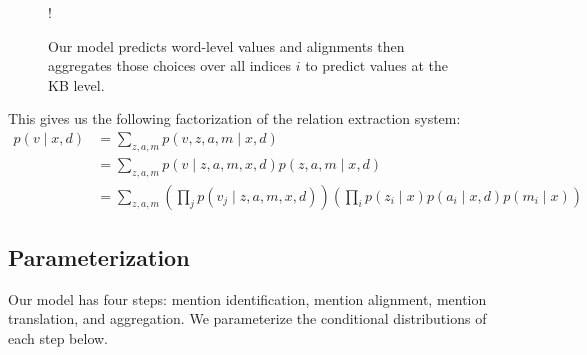 \documentclass[12pt]{article}
\begin{document}
\begin{figure}[h]
\begin{center}
\resizebox {.35\columnwidth} {!} {
} %
\end{center}
\caption{Our model predicts word-level values and alignments
then aggregates those choices over all indices $i$ to
predict values at the KB level.
}
\label{fig:infmodel}
\end{figure}

This gives us the following factorization of the relation extraction system:
\begin{equation}
\label{eqn:prob}
\begin{aligned}
p(v \mid x,d) &= \sum_{z,a,m} p(v,z,a,m\mid x,d)\\
&= \sum_{z,a,m} p(v\mid z,a,m,x,d) p(z, a, m\mid x,d)\\
&= \sum_{z,a,m} \left(\prod_j p(v_j\mid z,a,m,x,d)\right)
\left(\prod_i p(z_i\mid x)p(a_i\mid x,d)p(m_i\mid x)\right)
\end{aligned}
\end{equation}

\subsection{Parameterization}
Our model has four steps: mention identification, mention alignment, 
mention translation, and aggregation.
We parameterize the conditional distributions of each step below.
\end{document}
